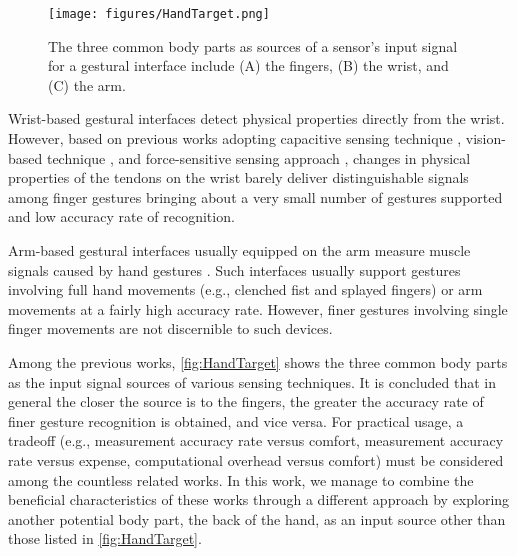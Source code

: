 \documentclass{sigchi}
\begin{document}
\begin{figure}
  \begin{center}
  \texttt{[image: figures/HandTarget.png]}
  \caption{The three common body parts as sources of a sensor's input signal for a gestural interface include (A) the fingers, (B) the wrist, and (C) the arm.}
  \label{fig:HandTarget}
  \end{center}
\end{figure}

Wrist-based gestural interfaces detect physical properties directly from the wrist.
However, based on previous works adopting capacitive sensing technique \cite{Rekimoto:2001:GGU:580581.856565}, vision-based technique \cite{Dementyev:2014:WLG:2642918.2647396}, and force-sensitive sensing approach \cite{Fukui:2011:HSC:2030112.2030154}, changes in physical properties of the tendons on the wrist barely deliver distinguishable signals among finger gestures bringing about a very small number of gestures supported and low accuracy rate of recognition.


Arm-based gestural interfaces usually equipped on the arm measure muscle signals caused by hand gestures \cite{Myo} \cite{Saponas:2009:EAI:1622176.1622208}. Such interfaces usually support gestures involving full hand movements (e.g., clenched fist and splayed fingers) or arm movements at a fairly high accuracy rate. However, finer gestures involving single finger movements are not discernible to such devices.

Among the previous works, \autoref{fig:HandTarget} shows the three common body parts as the input signal sources of various sensing techniques. It is concluded that in general the closer the source is to the fingers, the greater the accuracy rate of finer gesture recognition is obtained, and vice versa. For practical usage, a tradeoff (e.g., measurement accuracy rate versus comfort, measurement accuracy rate versus expense, computational overhead versus comfort) must be considered among the countless related works. In this work, we manage to combine the beneficial characteristics of these works through a different approach by exploring another potential body part, the back of the hand, as an input source other than those listed in \autoref{fig:HandTarget}.
\end{document}
